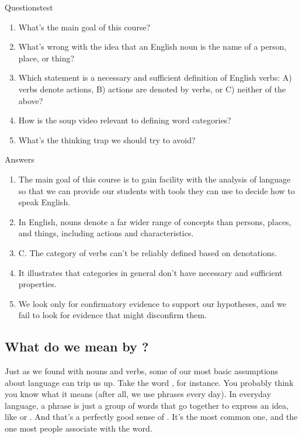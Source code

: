 \begin{tblsframedsymbol}{Questions}{test}
\begin{enumerate}[noitemsep, leftmargin=*]
    \item What's the main goal of this course?
    \item What's wrong with the idea that an English noun is the name of a person, place, or thing?
    \item Which statement is a necessary and sufficient definition of English verbs: A) verbs denote actions, B) actions are denoted by verbs, or C) neither of the above?
    \item How is the soup video relevant to defining word categories?
    \item What's the thinking trap we should try to avoid?
\end{enumerate}
\end{tblsframedsymbol}

\begin{tblsfilled}{Answers}
\begin{enumerate}[noitemsep, leftmargin=*]
    \item The main goal of this course is to gain facility with the analysis of language so that we can provide our students with tools they can use to decide how to speak English.
    \item In English, nouns denote a far wider range of concepts than persons, places, and things, including actions and characteristics.
    \item C. The category of verbs can't be reliably defined based on denotations.
    \item It illustrates that categories in general don't have necessary and sufficient properties.
    \item We look only for confirmatory evidence to support our hypotheses, and we fail to look for evidence that might disconfirm them.
\end{enumerate}
\end{tblsfilled}

\subsection{What do we mean by ?}\label{sec:phrases}

Just as we found with nouns and verbs, some of our most basic assumptions about language can trip us up. Take the word , for instance. You probably think you know what it means (after all, we use phrases every day). In everyday language, a phrase is just a group of words that go together to express an idea, like  or . And that's a perfectly good sense of . It's the most common one, and the one most people associate with the word.

